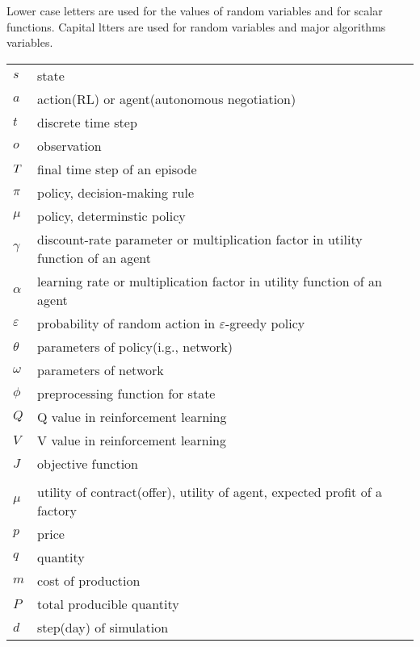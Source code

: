 Lower case letters are used for the values of random variables and for scalar functions. Capital ltters are used for random variables and major algorithms variables.

\begin{tabular}{p{1.5cm} p{12cm}}
$s$ & state \\
$a$ & action(RL) or agent(autonomous negotiation)\\
$t$ & discrete time step \\
$o$ & observation \\
$T$ & final time step of an episode \\
$\pi$ & policy, decision-making rule \\
$\mu$ & policy, determinstic policy \\
$\gamma$ & discount-rate parameter or multiplication factor in utility function of an agent\\
$\alpha$ & learning rate or multiplication factor in utility function of an agent\\
$\varepsilon$ & probability of random action in $\varepsilon$-greedy policy \\
$\theta$ & parameters of policy(i.g., network) \\
$\omega$ & parameters of network \\
$\phi$ & preprocessing function for state \\
$Q$ & Q value in reinforcement learning \\
$V$ & V value in reinforcement learning \\
$J$ & objective function \\
\\
$\mu$ & utility of contract(offer), utility of agent, expected profit of a factory \\
$p$ & price \\
$q$ & quantity \\
$m$ & cost of production \\
$P$ & total producible quantity \\
$d$ & step(day) of simulation \\
\end{tabular}



